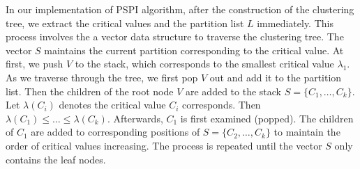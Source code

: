 \documentclass{ctexart}
\begin{document}
    In our implementation of PSPI algorithm,
    after the construction of the clustering tree,
    we extract the critical values and the partition list $L$
    immediately. This process involves the a vector data structure
    to traverse the
    clustering tree. 
    The vector $S$ maintains the current partition corresponding to the critical value.
    At first, we push $V$ to the stack, which corresponds to the smallest critical value
    $\lambda_1$. As we traverse
    through the tree, we first pop $V$ out and add it to the partition list.
    Then the children of the root node $V$ are added to the stack $S=\{C_1, \dots, C_k\}$.
    Let $\lambda(C_i)$ denotes the  critical value $C_i$ corresponds.
    Then $\lambda(C_1) \leq \dots \leq \lambda(C_k)$.
    Afterwards, $C_1$ is first examined (popped). The children of $C_1$ are added to corresponding
    positions of $S=\{C_2, \dots, C_k\}$ to maintain the order of critical values increasing.
    The process is repeated until the vector $S$ only contains the leaf nodes. 
\end{document}
